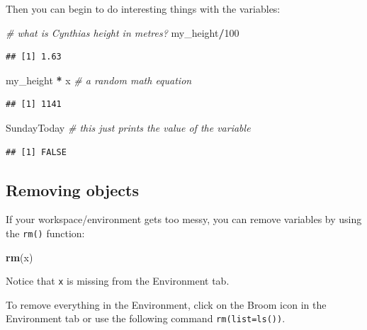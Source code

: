 \documentclass[
]{book}
\newenvironment{Shaded}{\begin{snugshade}}{\end{snugshade}}
\newcommand{\CommentTok}[1]{\textcolor[rgb]{0.56,0.35,0.01}{\textit{#1}}}
\newcommand{\DecValTok}[1]{\textcolor[rgb]{0.00,0.00,0.81}{#1}}
\newcommand{\FunctionTok}[1]{\textcolor[rgb]{0.13,0.29,0.53}{\textbf{#1}}}
\newcommand{\NormalTok}[1]{#1}
\newcommand{\SpecialCharTok}[1]{\textcolor[rgb]{0.81,0.36,0.00}{\textbf{#1}}}
\begin{document}
Then you can begin to do interesting things with the variables:

\begin{Shaded}
\begin{Highlighting}[]
\CommentTok{\# what is Cynthia\textquotesingle{}s height in metres?}
\NormalTok{my\_height}\SpecialCharTok{/}\DecValTok{100}
\end{Highlighting}
\end{Shaded}

\begin{verbatim}
## [1] 1.63
\end{verbatim}

\begin{Shaded}
\begin{Highlighting}[]
\NormalTok{my\_height }\SpecialCharTok{*}\NormalTok{ x }\CommentTok{\# a random math equation }
\end{Highlighting}
\end{Shaded}

\begin{verbatim}
## [1] 1141
\end{verbatim}

\begin{Shaded}
\begin{Highlighting}[]
\NormalTok{SundayToday }\CommentTok{\# this just prints the value of the variable }
\end{Highlighting}
\end{Shaded}

\begin{verbatim}
## [1] FALSE
\end{verbatim}

\subsection{Removing objects}\label{removing-objects}

If your workspace/environment gets too messy, you can remove variables by using the \texttt{rm()} function:

\begin{Shaded}
\begin{Highlighting}[]
\FunctionTok{rm}\NormalTok{(x)}
\end{Highlighting}
\end{Shaded}

Notice that \texttt{x} is missing from the Environment tab.

To remove everything in the Environment, click on the Broom icon in the Environment tab or use the following command \texttt{rm(list=ls())}.
\end{document}
